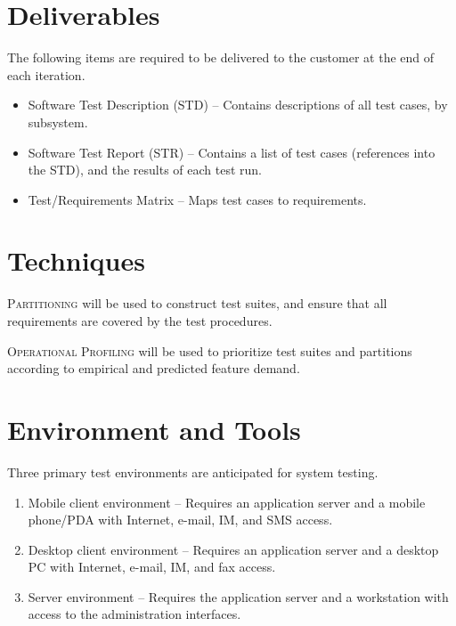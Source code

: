 \documentclass[11pt]{wacomepd}
\begin{document}
\section {Deliverables}
The following items are required to be delivered to the customer at the end of each iteration.

\begin{itemize}
\item Software Test Description (STD) -- Contains descriptions of all test cases, by subsystem.
\item Software Test Report (STR) -- Contains a list of test cases (references into the STD), and the
  results of each test run.
\item Test/Requirements Matrix -- Maps test cases to requirements.
\end{itemize}

\section {Techniques}

\textsc{Partitioning} will be used to construct test suites, and ensure that all requirements are
covered by the test procedures.

\textsc{Operational Profiling} will be used to prioritize test suites and partitions according to
empirical and predicted feature demand.

\section {Environment and Tools}
Three primary test environments are anticipated for system testing.

\begin{enumerate}
\item Mobile client environment -- Requires an application server and a mobile phone/PDA with
  Internet, e-mail, IM, and SMS access.
\item Desktop client environment -- Requires an application server and a desktop PC with Internet,
  e-mail, IM, and fax access.
\item Server environment -- Requires the application server and a workstation with access to the
  administration interfaces.
\end{enumerate}
\end{document}

